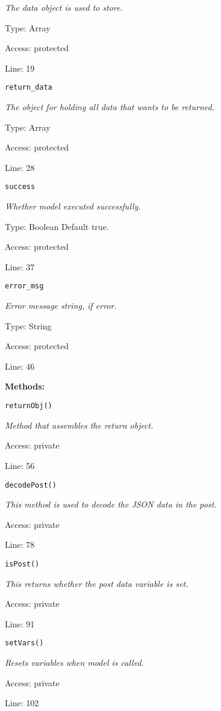 {\scriptsize
\textit{The data object is used to store.}

Type: Array

Access: protected

Line: 19

}
\texttt{return\_data}

{\scriptsize
\textit{The object for holding all data that wants to be returned.}

Type: Array

Access: protected

Line: 28

}
\texttt{success}

{\scriptsize
\textit{Whether model executed successfully.}

Type: {Boolean} Default true.

Access: protected

Line: 37

}
\texttt{error\_msg}

{\scriptsize
\textit{Error message string, if error.}

Type: String

Access: protected

Line: 46

}
\textbf{Methods:}

\texttt{returnObj()}

{\scriptsize
\textit{Method that assembles the return object.}

Access: private

Line: 56

}

\texttt{decodePost()}

{\scriptsize
\textit{This method is used to decode the JSON data in the post.}

Access: private

Line: 78

}

\texttt{isPost()}

{\scriptsize
\textit{This returns whether the post data variable is set.}

Access: private

Line: 91

}

\texttt{setVars()}

{\scriptsize
\textit{Resets variables when model is called.}

Access: private

Line: 102

}

